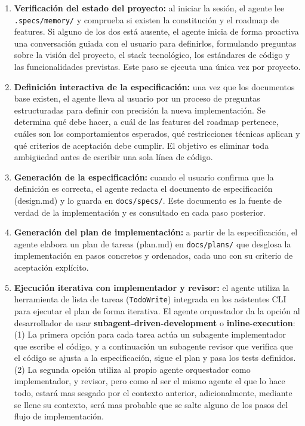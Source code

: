 \documentclass[11pt, letterpaper]{article}
\begin{document}
\begin{enumerate}
    \item \textbf{Verificación del estado del proyecto:} al iniciar la sesión, el agente lee \texttt{.specs/memory/} y comprueba si existen la constitución y el roadmap de features. Si alguno de los dos está ausente, el agente inicia de forma proactiva una conversación guiada con el usuario para definirlos, formulando preguntas sobre la visión del proyecto, el stack tecnológico, los estándares de código y las funcionalidades previstas. Este paso se ejecuta una única vez por proyecto.
    \item \textbf{Definición interactiva de la especificación:} una vez que los documentos base existen, el agente lleva al usuario por un proceso de preguntas estructuradas para definir con precisión la nueva implementación. Se determina qué debe hacer, a cuál de las features del roadmap pertenece, cuáles son los comportamientos esperados, qué restricciones técnicas aplican y qué criterios de aceptación debe cumplir. El objetivo es eliminar toda ambigüedad antes de escribir una sola línea de código.
    \item \textbf{Generación de la especificación:} cuando el usuario confirma que la definición es correcta, el agente redacta el documento de especificación (design.md) y lo guarda en \texttt{docs/specs/}. Este documento es la fuente de verdad de la implementación y es consultado en cada paso posterior.
    \item \textbf{Generación del plan de implementación:} a partir de la especificación, el agente elabora un plan de tareas (plan.md) en \texttt{docs/plans/} que desglosa la implementación en pasos concretos y ordenados, cada uno con su criterio de aceptación explícito.
    \item \textbf{Ejecución iterativa con implementador y revisor:} el agente utiliza la herramienta de lista de tareas (\texttt{TodoWrite}) integrada en los asistentes CLI para ejecutar el plan de forma iterativa. El agente orquestador da la opción al desarrollador de usar \textbf{subagent-driven-development} o \textbf{inline-execution}: (1) La primera opción para cada tarea actúa un subagente implementador que escribe el código, y a continuación un subagente revisor que verifica que el código se ajusta a la especificación, sigue el plan y pasa los tests definidos. (2) La segunda opción utiliza al propio agente orquestador como implementador, y revisor, pero como al ser el mismo agente el que lo hace todo, estará mas sesgado por el contexto anterior, adicionalmente, mediante se llene su contexto, será mas probable que se salte alguno de los pasos del flujo de implementación. 
    \end{enumerate}
\end{document}
